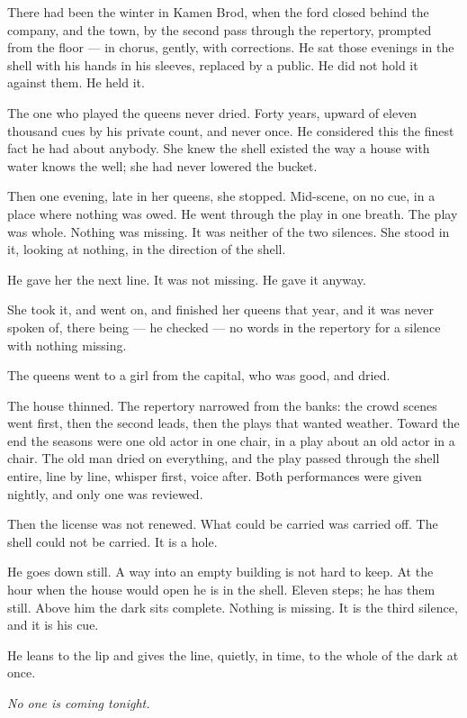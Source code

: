 \documentclass[11pt]{article}
\begin{document}
There had been the winter in Kamen Brod, when the ford closed behind the company, and the town, by the second pass through the repertory, prompted from the floor — in chorus, gently, with corrections. He sat those evenings in the shell with his hands in his sleeves, replaced by a public. He did not hold it against them. He held it.

The one who played the queens never dried. Forty years, upward of eleven thousand cues by his private count, and never once. He considered this the finest fact he had about anybody. She knew the shell existed the way a house with water knows the well; she had never lowered the bucket.

Then one evening, late in her queens, she stopped. Mid-scene, on no cue, in a place where nothing was owed. He went through the play in one breath. The play was whole. Nothing was missing. It was neither of the two silences. She stood in it, looking at nothing, in the direction of the shell.

He gave her the next line. It was not missing. He gave it anyway.

She took it, and went on, and finished her queens that year, and it was never spoken of, there being — he checked — no words in the repertory for a silence with nothing missing.

The queens went to a girl from the capital, who was good, and dried.

The house thinned. The repertory narrowed from the banks: the crowd scenes went first, then the second leads, then the plays that wanted weather. Toward the end the seasons were one old actor in one chair, in a play about an old actor in a chair. The old man dried on everything, and the play passed through the shell entire, line by line, whisper first, voice after. Both performances were given nightly, and only one was reviewed.

Then the license was not renewed. What could be carried was carried off. The shell could not be carried. It is a hole.

He goes down still. A way into an empty building is not hard to keep. At the hour when the house would open he is in the shell. Eleven steps; he has them still. Above him the dark sits complete. Nothing is missing. It is the third silence, and it is his cue.

He leans to the lip and gives the line, quietly, in time, to the whole of the dark at once.

\emph{No one is coming tonight.}
\end{document}
